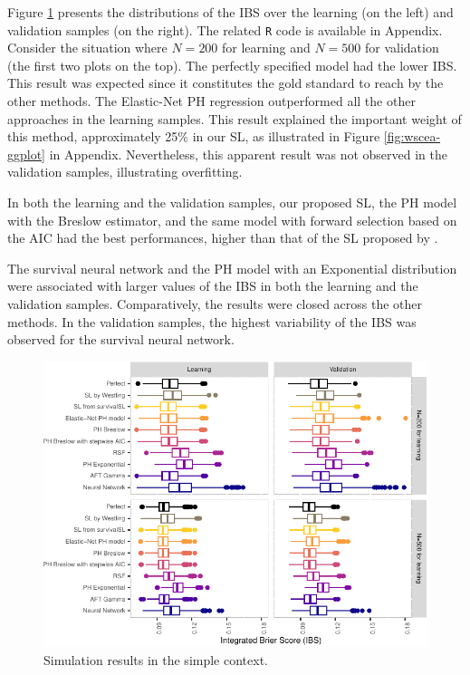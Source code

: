 Figure \ref{fig:ibs-scea-ggplot} presents the distributions of the IBS over the learning (on the left) and validation samples (on the right). The related \texttt{R} code is available in Appendix. Consider the situation where \(N=200\) for learning and \(N=500\) for validation (the first two plots on the top). The perfectly specified model had the lower IBS. This result was expected since it constitutes the gold standard to reach by the other methods. The Elastic-Net PH regression outperformed all the other approaches in the learning samples. This result explained the important weight of this method, approximately 25\% in our SL, as illustrated in Figure \ref{fig:wscea-ggplot} in Appendix. Nevertheless, this apparent result was not observed in the validation samples, illustrating overfitting.

In both the learning and the validation samples, our proposed SL, the PH model with the Breslow estimator, and the same model with forward selection based on the AIC had the best performances, higher than that of the SL proposed by \citet{westlingPkgsurvSuperLearnerSuperLearning2021}.

The survival neural network and the PH model with an Exponential distribution were associated with larger values of the IBS in both the learning and the validation samples. Comparatively, the results were closed across the other methods. In the validation samples, the highest variability of the IBS was observed for the survival neural network.

\begin{figure}

{\centering \includegraphics{RJ-2024-037_files/figure-latex/ibs-scea-ggplot-1} 

}

\caption{Simulation results in the simple context.}\label{fig:ibs-scea-ggplot}
\end{figure}

